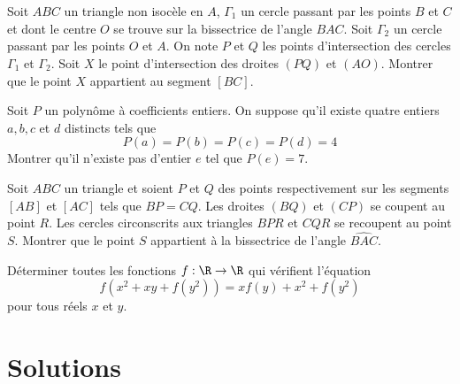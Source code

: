 \begin{exo}
Soit $ABC$ un triangle non isocèle en $A$, $\Gamma_1$ un cercle passant par les points $B$ et $C$ et dont le centre $O$ se trouve sur la bissectrice de l'angle $\widehat{BAC}$. Soit $\Gamma_2$ un cercle passant par les points $O$ et $A$. On note $P$ et $Q$ les points d'intersection des cercles $\Gamma_1$ et $\Gamma_2$. Soit $X$ le point d'intersection des droites $(PQ)$ et $(AO)$. Montrer que le point $X$ appartient au segment $[BC]$.
\end{exo}


\begin{exo}
Soit $P$ un polynôme à coefficients entiers. On suppose qu'il existe quatre entiers $a, b, c$ et $d$ distincts tels que
$$P(a) = P(b) = P(c) = P(d) = 4$$
\noindent Montrer qu'il n'existe pas d'entier $e$ tel que $P(e) = 7$. 
\end{exo}


\begin{exo}
Soit $ABC$ un triangle et soient $P$ et $Q$ des points respectivement sur les segments $[AB]$ et $[AC]$ tels que $BP=CQ$. Les droites $(BQ)$ et $(CP)$ se coupent au point $R$. Les cercles circonscrits aux triangles $BPR$ et $CQR$ se recoupent au point $S$. Montrer que le point $S$ appartient à la bissectrice de l'angle $\widehat{BAC}$.
\end{exo}

\begin{exo}
Déterminer toutes les fonctions $f : \R \rightarrow \R$ qui vérifient l'équation
$$f\left(x^2+xy+f(y^2)\right)=xf(y)+x^2+f(y^2)$$
pour tous réels $x$ et $y$.
\end{exo}


\section{Solutions}
\setcounter{exo}{0}

